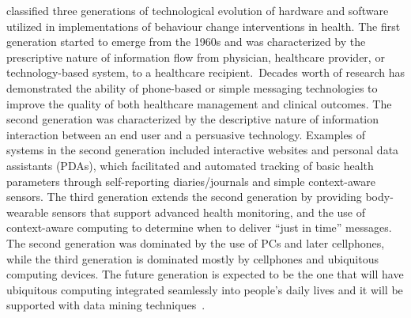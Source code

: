 \cite{chatterjee2009healthy} classified three generations  of technological evolution of hardware and software utilized in implementations of behaviour change interventions in health. The first generation started to emerge from the 1960s and was characterized by the prescriptive nature of information flow from physician, healthcare provider, or technology-based system, to a healthcare recipient.~Decades worth of research has demonstrated the ability of phone-based or simple messaging technologies to improve the quality of both healthcare management and clinical outcomes. The second generation was characterized by the descriptive nature of information interaction between an end user and a persuasive technology. Examples of systems in the second generation included interactive websites and personal data assistants (PDAs), which facilitated and automated tracking of basic health parameters through self-reporting diaries/journals and simple context-aware sensors. The third generation extends the second generation by providing body-wearable sensors that support advanced health monitoring, and the use of context-aware computing to determine when to deliver “just in time” messages.  The second generation was dominated by the use of PCs and later cellphones, while the third generation is dominated mostly by cellphones and ubiquitous computing devices. The future generation is expected to be the one that will have ubiquitous computing integrated seamlessly into people's daily lives and it will be supported with data mining techniques~\citep{chatterjee2009healthy}.

